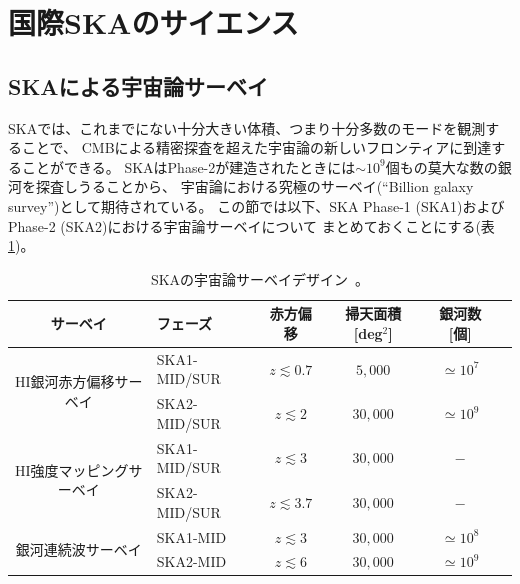 \section{国際SKAのサイエンス}\label{cosmology.s2}

\subsection{SKAによる宇宙論サーベイ}\label{cosmology.s2.ss0}

SKAでは、これまでにない十分大きい体積、つまり十分多数のモードを観測することで、
CMBによる精密探査を超えた宇宙論の新しいフロンティアに到達することができる。
SKAはPhase-2が建造されたときには$\sim 10^9$個もの莫大な数の銀河を探査しうることから、
宇宙論における究極のサーベイ(``Billion galaxy survey'')として期待されている。
この節では以下、SKA Phase-1 (SKA1)およびPhase-2 (SKA2)における宇宙論サーベイについて
まとめておくことにする(表\ref{table:survey design})。

\begin{table}
\caption{SKAの宇宙論サーベイデザイン~\citep{Maartens:2015mra}。}
\vspace{10pt}
 \centering
 \begin{tabular}{c|l|cccc}\hline\hline
  サーベイ & フェーズ & 赤方偏移 & 掃天面積 [deg$^2$] & 銀河数 [個] & \\\hline
  \multirow{2}{*}{HI銀河赤方偏移サーベイ}
  & SKA1-MID/SUR & $z\lesssim 0.7$ &  $5,000$ & $\simeq 10^7$ \\\cline{2-6}
  & SKA2-MID/SUR & $z\lesssim 2$   & $30,000$ & $\simeq 10^9$ & \\\cline{2-6}
  \hline
  \multirow{2}{*}{HI強度マッピングサーベイ}
  & SKA1-MID/SUR & $z\lesssim 3$   & $30,000$ & $-$ \\\cline{2-6}
  & SKA2-MID/SUR & $z\lesssim 3.7$   & $30,000$ & $-$ & \\\cline{2-6}
  \hline
  \multirow{2}{*}{銀河連続波サーベイ}
  & SKA1-MID & $z\lesssim 3$   & $30,000$ & $\simeq 10^8$ \\\cline{2-6}
  & SKA2-MID & $z\lesssim 6$   & $30,000$ & $\simeq 10^9$ & \\\cline{2-6}
  \hline\hline
\end{tabular}
\label{table:survey design}
\end{table}

